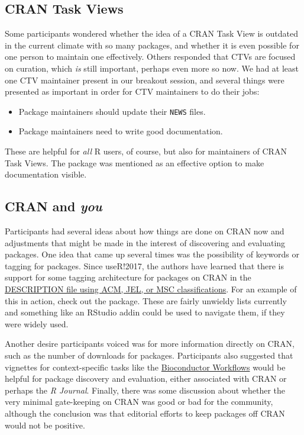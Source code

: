 \hypertarget{cran-task-views}{%
\subsection{CRAN Task Views}\label{cran-task-views}}

Some participants wondered whether the idea of a CRAN Task View
\citep{ctvs} is outdated in the current climate with so many packages,
and whether it is even possible for one person to maintain one
effectively. Others responded that CTVs are focused on curation, which
\emph{is} still important, perhaps even more so now. We had at least one
CTV maintainer present in our breakout session, and several things were
presented as important in order for CTV maintainers to do their jobs:

\begin{itemize}
\tightlist
\item
  Package maintainers should update their \texttt{NEWS} files.
\item
  Package maintainers need to write good documentation.
\end{itemize}

These are helpful for \emph{all} R users, of course, but also for
maintainers of CRAN Task Views. The  \citep{pkgdown}
package was mentioned as an effective option to make documentation
visible.

\hypertarget{cran-and-you}{%
\subsection{\texorpdfstring{CRAN and
\emph{you}}{CRAN and you}}\label{cran-and-you}}

Participants had several ideas about how things are done on CRAN now and
adjustments that might be made in the interest of discovering and
evaluating packages. One idea that came up several times was the
possibility of keywords or tagging for packages. Since useR!2017, the
authors have learned that there is support for some tagging architecture
for packages on CRAN in the
\href{https://cran.r-project.org/doc/manuals/r-release/R-exts.html\#The-DESCRIPTION-file}{DESCRIPTION
file using ACM, JEL, or MSC classifications}. For an example of this in
action, check out the  \citep{lfe} package. These are
fairly unwieldy lists currently and something like an RStudio addin
could be used to navigate them, if they were widely used.

Another desire participants voiced was for more information directly on
CRAN, such as the number of downloads for packages. Participants also
suggested that vignettes for context-specific tasks like the
\href{https://www.bioconductor.org/packages/release/workflows/}{Bioconductor
Workflows} \citep{bioc} would be helpful for package discovery and
evaluation, either associated with CRAN or perhaps the \emph{R Journal}.
Finally, there was some discussion about whether the very minimal
gate-keeping on CRAN was good or bad for the community, although the
conclusion was that editorial efforts to keep packages off CRAN would
not be positive.

